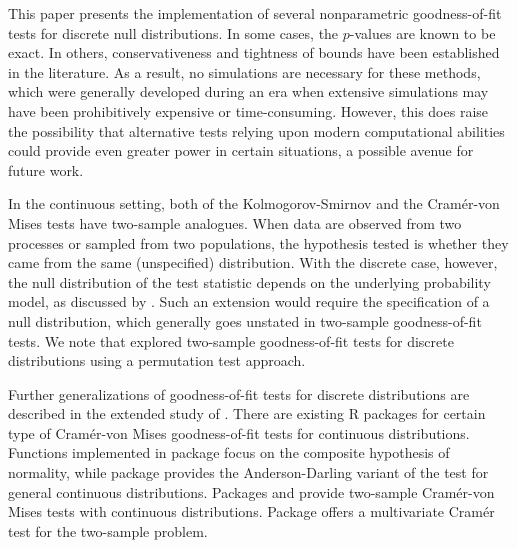 This paper presents the implementation of several nonparametric
goodness-of-fit tests for discrete null distributions.  In some cases,
the $p$-values are known to be exact.  In others, conservativeness 
and tightness of bounds have been established in the literature.  As a result,
no simulations are necessary for these methods, which were generally
developed during an era when extensive simulations may have been
prohibitively expensive or time-consuming.
However, this does raise the possibility that alternative tests relying upon
modern computational abilities could provide even greater power in certain
situations, a possible avenue for future work.

In the continuous setting, both of 
the Kolmogorov-Smirnov and the Cram\'{e}r-von Mises tests
have two-sample analogues. When data are
observed from two processes or sampled from two populations, 
the hypothesis tested is 
whether they came from the same (unspecified) distribution. 
With the discrete case, however, the null distribution of the
test statistic depends on the underlying
probability model, as discussed by \cite{walsh1963}.
Such an extension would require the specification of a
null distribution, which generally goes unstated in two-sample
goodness-of-fit tests.  We note that
\cite{Mdufour2001} explored two-sample goodness-of-fit tests for
discrete distributions using a permutation test approach.

Further 
generalizations of goodness-of-fit tests for discrete distributions
are described in the extended study of \cite{dewev1973}.  There are
existing R packages for certain type of Cram\'{e}r-von Mises 
goodness-of-fit tests for continuous distributions.
Functions implemented in package  
\citep{nortest} focus on the
composite hypothesis of normality, while
package  \citep{ADGofTest} provides the Anderson-Darling variant
of the test for general continuous distributions.  Packages
 \citep{CvM2SL1Test} and  
\citep{CvM2SL2Test} provide
two-sample Cram\'{e}r-von Mises tests with continuous distributions.
Package  \citep{cramer} offers a multivariate Cram\'{e}r test for
the two-sample problem.


%



\address{Taylor B. Arnold \\
Yale University\\
24 Hillhouse Ave. \\
New Haven, CT 06511
USA\\
}

\address{John W. Emerson \\
Yale University\\
24 Hillhouse Ave. \\
New Haven, CT 06511
USA\\
}

